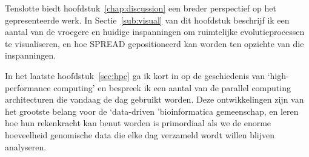 {Tenslotte biedt hoofdstuk~\ref{chap:discussion} een breder perspectief op het gepresenteerde werk.
In Sectie~\ref{sub:visual} van dit hoofdstuk beschrijf ik een aantal van de vroegere en huidige inspanningen om ruimtelijke evolutieprocessen te visualiseren, en hoe SPREAD gepositioneerd kan worden ten opzichte van die inspanningen.

In het laatste hoofdstuk~\ref{sec:hpc} ga ik kort in op de geschiedenis van `high-performance computing' en bespreek ik een aantal van de parallel computing architecturen die vandaag de dag gebruikt worden.
Deze ontwikkelingen zijn van het grootste belang voor de `data-driven 'bioinformatica gemeenschap, en leren hoe hun rekenkracht kan benut worden is primordiaal als we de enorme hoeveelheid genomische data die elke dag verzameld wordt willen blijven analyseren.

}

